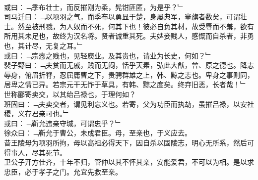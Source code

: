 \\
或曰：﹁季布壮士，而反摧刚为柔，髡钳匪匿，为是乎？﹂\\
司马迁曰：﹁以项羽之气，而季布以勇显于楚，身屡典军，搴旗者数矣，可谓壮士。然至被刑戮，为人奴而不死，何其下也！彼必自负其材，故受辱而不羞，欲有所用其未足也，故终为汉名将。贤者诚重其死。夫婢妾贱人，感慨而自杀者，非勇也，其计尽，无复之耳。﹂
\\
或曰：﹁宗悫之贱也，见轻庾业。及其贵也，请业为长史，何如？﹂\\
裴子野曰：﹁夫贫而无戚，贱而无闷，恬乎天素，弘此大猷，曾、原之德也。降志辱身，俯眉折脊，忍屈庸曹之下，贵骋群雄之上，韩、黥之志也。卑身之事则同，居卑之情已异。若宗元干无怍于草具，有韩、黥之度矣。终弃旧恶，长者哉！﹂
\\
世称郦寄卖交，以其绐吕禄也，于理何如？\\
班固曰：﹁夫卖交者，谓见利忘义也。若寄，父为功臣而执劫，虽摧吕禄，以安社稷，义存君亲可也。﹂\\
或曰：﹁靳允违亲守城，可谓忠乎？﹂\\
徐众曰：﹁靳允于曹公，未成君臣。母，至亲也，于义应去。\\
昔王陵母为项羽所拘，母以高祖必得天下，因自杀以固陵志，明心无所系，然后可得事人，尽其死节。\\
卫公子开方仕齐，十年不归，管仲以其不怀其亲，安能爱君，不可以为相。是以求忠臣，必于孝子之门。允宜先救至亲。\\
